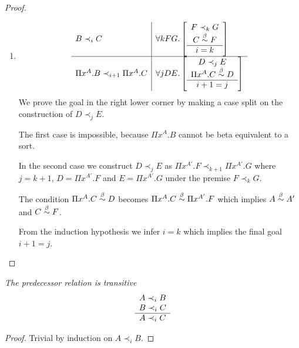 \begin{lemma}
\begin{proof}
\begin{enumerate}
        \item
        $$
            \begin{array}{l|l}
                B \prec_i C
                &
                \forall k F G.
                \left[
                \begin{array}{c} F \prec_k G \\ C \stackrel{\beta}{\sim} F \\ \hline i = k\end{array}
                \right]
                \\
                \hline
                \Pi x^A.B \prec_{i+1} \Pi x^A. C
                &
                \forall j D E.
                \left[
                \begin{array}{c} 
                    D \prec_j E
                    \\
                    \Pi x^A. C \stackrel{\beta}{\sim} D
                 \\ \hline i+1 = j\end{array}
                \right]
            \end{array}
        $$
        We prove the goal in the right lower corner by making a case split on
        the construction of $D \prec_j E$.

        The first case is impossible, because $\Pi x^A. B$ cannot be beta
        equivalent to a sort.

        In the second case we construct $D \prec_j E$ as
        $\Pi x^{A'}. F \prec_{k+1} \Pi x^{A'}. G$ where $j = k + 1$,
        $D = \Pi x^{A'}. F$ and $E = \Pi x^{A'}. G$
        under the premise $F \prec_k G$.

        The condition $\Pi x^A. C \stackrel{\beta}{\sim} D$ becomes $\Pi x^A.C \stackrel{\beta}{\sim} \Pi
        x^{A'}. F$ which implies $A \stackrel{\beta}{\sim} A'$ and $C \stackrel{\beta}{\sim} F$.

        From the induction hypothesis we infer $i = k$ which implies the final
        goal $i + 1 = j$.
        \end{enumerate}
    \end{proof}
\end{lemma}



\begin{lemma}
    \label{PrecedenceTransitive}
    \emph{The predecessor relation is transitive}
    $$
    \begin{array}{c} 
        A \prec_i B
        \\
        B \prec_i C
     \\ \hline 
        A \prec_i C
    \end{array}
    $$
    \begin{proof}
        Trivial by induction on $A \prec_i B$.
    \end{proof}
\end{lemma}






